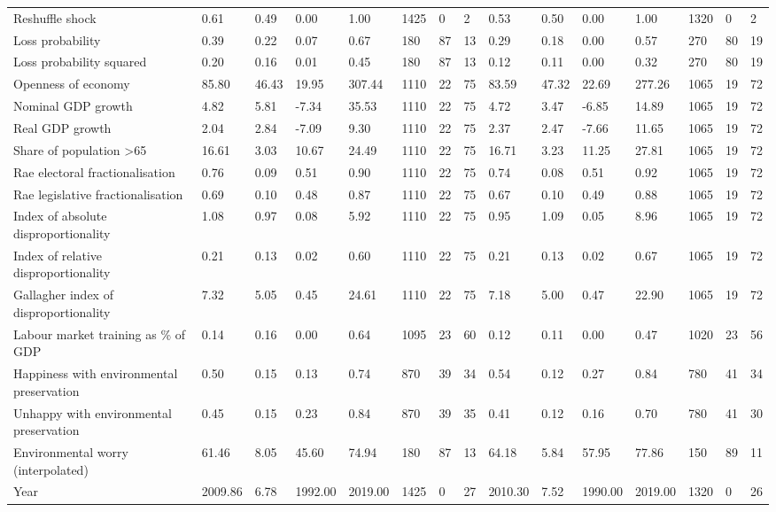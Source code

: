 \begin{longtable}{lllllllllllllll}
\addlinespace
Reshuffle shock & 0.61 & 0.49 & 0.00 & 1.00 & 1425 & 0 & 2 & 0.53 & 0.50 & 0.00 & 1.00 & 1320 & 0 & 2\\
Loss probability & 0.39 & 0.22 & 0.07 & 0.67 & 180 & 87 & 13 & 0.29 & 0.18 & 0.00 & 0.57 & 270 & 80 & 19\\
Loss probability squared & 0.20 & 0.16 & 0.01 & 0.45 & 180 & 87 & 13 & 0.12 & 0.11 & 0.00 & 0.32 & 270 & 80 & 19\\
Openness of economy & 85.80 & 46.43 & 19.95 & 307.44 & 1110 & 22 & 75 & 83.59 & 47.32 & 22.69 & 277.26 & 1065 & 19 & 72\\
Nominal GDP growth & 4.82 & 5.81 & -7.34 & 35.53 & 1110 & 22 & 75 & 4.72 & 3.47 & -6.85 & 14.89 & 1065 & 19 & 72\\
\addlinespace
Real GDP growth & 2.04 & 2.84 & -7.09 & 9.30 & 1110 & 22 & 75 & 2.37 & 2.47 & -7.66 & 11.65 & 1065 & 19 & 72\\
Share of population >65 & 16.61 & 3.03 & 10.67 & 24.49 & 1110 & 22 & 75 & 16.71 & 3.23 & 11.25 & 27.81 & 1065 & 19 & 72\\
Rae electoral fractionalisation & 0.76 & 0.09 & 0.51 & 0.90 & 1110 & 22 & 75 & 0.74 & 0.08 & 0.51 & 0.92 & 1065 & 19 & 72\\
Rae legislative fractionalisation & 0.69 & 0.10 & 0.48 & 0.87 & 1110 & 22 & 75 & 0.67 & 0.10 & 0.49 & 0.88 & 1065 & 19 & 72\\
Index of absolute disproportionality & 1.08 & 0.97 & 0.08 & 5.92 & 1110 & 22 & 75 & 0.95 & 1.09 & 0.05 & 8.96 & 1065 & 19 & 72\\
\addlinespace
Index of relative disproportionality & 0.21 & 0.13 & 0.02 & 0.60 & 1110 & 22 & 75 & 0.21 & 0.13 & 0.02 & 0.67 & 1065 & 19 & 72\\
Gallagher index of disproportionality & 7.32 & 5.05 & 0.45 & 24.61 & 1110 & 22 & 75 & 7.18 & 5.00 & 0.47 & 22.90 & 1065 & 19 & 72\\
Labour market training as \% of GDP & 0.14 & 0.16 & 0.00 & 0.64 & 1095 & 23 & 60 & 0.12 & 0.11 & 0.00 & 0.47 & 1020 & 23 & 56\\
Happiness with environmental preservation & 0.50 & 0.15 & 0.13 & 0.74 & 870 & 39 & 34 & 0.54 & 0.12 & 0.27 & 0.84 & 780 & 41 & 34\\
Unhappy with environmental preservation & 0.45 & 0.15 & 0.23 & 0.84 & 870 & 39 & 35 & 0.41 & 0.12 & 0.16 & 0.70 & 780 & 41 & 30\\
\addlinespace
Environmental worry (interpolated) & 61.46 & 8.05 & 45.60 & 74.94 & 180 & 87 & 13 & 64.18 & 5.84 & 57.95 & 77.86 & 150 & 89 & 11\\
Year & 2009.86 & 6.78 & 1992.00 & 2019.00 & 1425 & 0 & 27 & 2010.30 & 7.52 & 1990.00 & 2019.00 & 1320 & 0 & 26\\
\bottomrule
\end{longtable}
